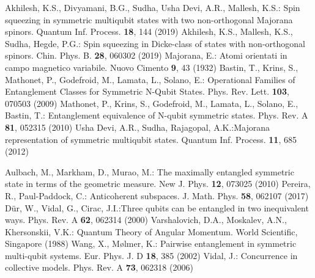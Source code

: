 \documentclass[pra,a4paper,showpacs,superscriptaddress]{revtex4}
\begin{document}
\begin{thebibliography}{50}
 Akhilesh, K.S., Divyamani, B.G., Sudha, Usha Devi, 
A.R., Mallesh, K.S.: Spin squeezing in symmetric multiqubit states 
with two
non-orthogonal Majorana spinors. Quantum Inf. Process. {\bf 18}, 144 
(2019)
 Akhilesh, K.S., Mallesh, K.S., Sudha, Hegde, P.G.: 
Spin squeezing in Dicke-class of states with non-orthogonal spinors. 
Chin. Phys. B. {\bf 28}, 060302 (2019)
 Majorana, E.: Atomi orientati in campo magnetico 
variabile. Nuovo Cimento {\bf 9}, 43 (1932)
  Bastin, T., Krins, S., Mathonet, P., Godefroid, 
M.,  
Lamata, L., Solano, E.: Operational Families of Entanglement Classes 
for Symmetric N-Qubit States.  Phys. Rev. Lett. {\bf 103}, 
070503 (2009) 
  Mathonet, P., Krins, S., Godefroid, M., Lamata, L., 
Solano, 
E., Bastin, T.: Entanglement equivalence of N-qubit symmetric states. 
Phys. Rev. A {\bf 81}, 052315 (2010)
 Usha Devi, A.R., Sudha, Rajagopal, A.K.:Majorana 
representation of symmetric multiqubit states. 
Quantum Inf. Process. {\bf 11}, 685 (2012)

 Aulbach, M., Markham, D., Murao, M.: The maximally 
entangled symmetric state in terms of
the geometric measure. New J. Phys. {\bf 12}, 073025 (2010)
 Pereira, R., Paul-Paddock, C.: Anticoherent 
subspaces. J. Math. Phys. {\bf 58}, 062107 (2017)
 D{\"{u}}r, W., Vidal, G., Cirac, J.I.:Three qubits can 
be entangled in two inequivalent ways. Phys. Rev. A {\bf 62}, 062314 (2000)
 Varshalovich, D.A., Moskalev, A.N., Khersonskii, V.K.: 
 Quantum Theory of Angular Momentum. World Scientific, 
Singapore (1988)
   Wang, X., M{\o}lmer, K.: Pairwise entanglement in 
symmetric multi-qubit systems.  Eur.  Phys. J.  D 
{\bf 18}, 385 (2002)
  Vidal, J.: Concurrence in collective models. Phys. 
Rev. A {\bf 73}, 062318 (2006)

\end{thebibliography}
\end{document}
